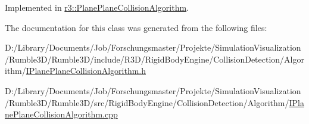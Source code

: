 Implemented in \mbox{\hyperlink{classr3_1_1_plane_plane_collision_algorithm_a33400ba57a8c0550ada0778bb92eeb69}{r3\+::\+Plane\+Plane\+Collision\+Algorithm}}.



The documentation for this class was generated from the following files\+:\begin{DoxyCompactItemize}
\item 
D\+:/\+Library/\+Documents/\+Job/\+Forschungsmaster/\+Projekte/\+Simulation\+Visualization/\+Rumble3\+D/\+Rumble3\+D/include/\+R3\+D/\+Rigid\+Body\+Engine/\+Collision\+Detection/\+Algorithm/\mbox{\hyperlink{_i_plane_plane_collision_algorithm_8h}{I\+Plane\+Plane\+Collision\+Algorithm.\+h}}\item 
D\+:/\+Library/\+Documents/\+Job/\+Forschungsmaster/\+Projekte/\+Simulation\+Visualization/\+Rumble3\+D/\+Rumble3\+D/src/\+Rigid\+Body\+Engine/\+Collision\+Detection/\+Algorithm/\mbox{\hyperlink{_i_plane_plane_collision_algorithm_8cpp}{I\+Plane\+Plane\+Collision\+Algorithm.\+cpp}}\end{DoxyCompactItemize}
